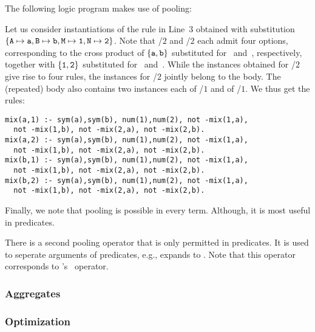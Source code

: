 \begin{example}\label{ex:pool}
The following logic program makes use of pooling:
%

%
Let us consider instantiations of the rule in Line~3 obtained with substitution 
$\{\var{A}\mapsto\const{a},\linebreak[1]\var{B}\mapsto\const{b},
   \var{M}\mapsto\const{1},\var{N}\mapsto\const{2}\}$.
Note that /$2$ and /$2$ each admit four options,
corresponding to the cross product of $\{\texttt{a},\texttt{b}\}$ substituted
for~ and~, respectively, together with $\{\texttt{1},\texttt{2}\}$
substituted for~ and~.
While the instances obtained for /$2$ give rise to four rules,
the instances for /$2$ jointly belong to the body.
The (repeated) body also contains two instances each of /$1$ and of /$1$.
We thus get the rules:%
%
\begin{lstlisting}[numbers=none]
mix(a,1) :- sym(a),sym(b), num(1),num(2), not -mix(1,a),
  not -mix(1,b), not -mix(2,a), not -mix(2,b).
mix(a,2) :- sym(a),sym(b), num(1),num(2), not -mix(1,a),
  not -mix(1,b), not -mix(2,a), not -mix(2,b).
mix(b,1) :- sym(a),sym(b), num(1),num(2), not -mix(1,a),
  not -mix(1,b), not -mix(2,a), not -mix(2,b).
mix(b,2) :- sym(a),sym(b), num(1),num(2), not -mix(1,a),
  not -mix(1,b), not -mix(2,a), not -mix(2,b).
\end{lstlisting}
%
Finally, we note that pooling is possible in every term.
Although, it is most useful in predicates.
\eexample
\end{example}

\begin{newstuff}
There is a second pooling operator \code{;;} that is only permitted in predicates.
It is used to seperate arguments of predicates,
e.g.,  expands to .
Note that this operator corresponds to \lparse's~\code{;} operator.
\end{newstuff}

\subsubsection{Aggregates}\label{subsec:gringo:aggregate}


\subsubsection{Optimization}\label{subsec:gringo:optimize}

